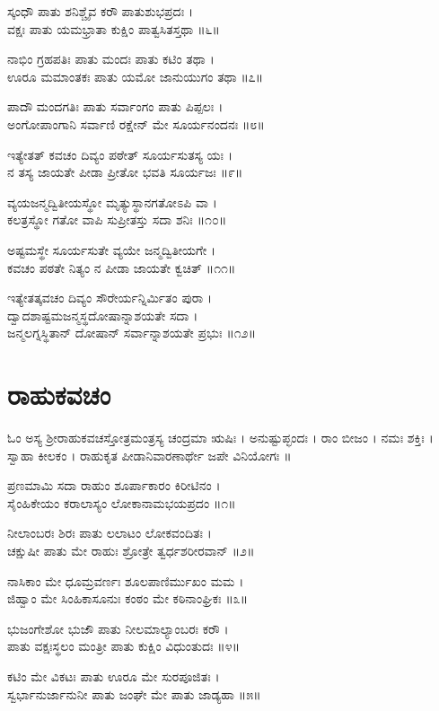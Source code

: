 ಸ್ಕಂಧೌ ಪಾತು ಶನಿಶ್ಚೈವ ಕರೌ ಪಾತುಶುಭಪ್ರದಃ ।\\
ವಕ್ಷಃ ಪಾತು ಯಮಭ್ರಾತಾ ಕುಕ್ಷಿಂ ಪಾತ್ವಸಿತಸ್ತಥಾ ॥೬॥

ನಾಭಿಂ ಗ್ರಹಪತಿಃ ಪಾತು ಮಂದಃ ಪಾತು ಕಟಿಂ ತಥಾ ।\\
ಊರೂ ಮಮಾಂತಕಃ ಪಾತು ಯಮೋ ಜಾನುಯುಗಂ ತಥಾ ॥೭॥

ಪಾದೌ ಮಂದಗತಿಃ ಪಾತು ಸರ್ವಾಂಗಂ ಪಾತು ಪಿಪ್ಪಲಃ ।\\
ಅಂಗೋಪಾಂಗಾನಿ ಸರ್ವಾಣಿ ರಕ್ಷೇನ್ ಮೇ ಸೂರ್ಯನಂದನಃ ॥೮॥

ಇತ್ಯೇತತ್ ಕವಚಂ ದಿವ್ಯಂ ಪಠೇತ್ ಸೂರ್ಯಸುತಸ್ಯ ಯಃ ।\\
ನ ತಸ್ಯ ಜಾಯತೇ ಪೀಡಾ ಪ್ರೀತೋ ಭವತಿ ಸೂರ್ಯಜಃ ॥೯॥

ವ್ಯಯಜನ್ಮದ್ವಿತೀಯಸ್ಥೋ ಮೃತ್ಯುಸ್ಥಾನಗತೋಽಪಿ ವಾ ।\\
ಕಲತ್ರಸ್ಥೋ ಗತೋ ವಾಪಿ ಸುಪ್ರೀತಸ್ತು ಸದಾ ಶನಿಃ ॥೧೦॥

ಅಷ್ಟಮಸ್ಥೇ ಸೂರ್ಯಸುತೇ ವ್ಯಯೇ ಜನ್ಮದ್ವಿತೀಯಗೇ ।\\
ಕವಚಂ ಪಠತೇ ನಿತ್ಯಂ ನ ಪೀಡಾ ಜಾಯತೇ ಕ್ವಚಿತ್ ॥೧೧॥

ಇತ್ಯೇತತ್ಕವಚಂ ದಿವ್ಯಂ ಸೌರೇರ್ಯನ್ನಿರ್ಮಿತಂ ಪುರಾ ।\\
ದ್ವಾದಶಾಷ್ಟಮಜನ್ಮಸ್ಥದೋಷಾನ್ನಾಶಯತೇ ಸದಾ ।\\
ಜನ್ಮಲಗ್ನಸ್ಥಿತಾನ್ ದೋಷಾನ್ ಸರ್ವಾನ್ನಾಶಯತೇ ಪ್ರಭುಃ ॥೧೨॥
\section{ರಾಹುಕವಚಂ}

ಓಂ ಅಸ್ಯ ಶ್ರೀರಾಹುಕವಚಸ್ತೋತ್ರಮಂತ್ರಸ್ಯ ಚಂದ್ರಮಾ ಋಷಿಃ । ಅನುಷ್ಟುಪ್ಛಂದಃ । ರಾಂ ಬೀಜಂ । ನಮಃ ಶಕ್ತಿಃ । ಸ್ವಾಹಾ ಕೀಲಕಂ । ರಾಹುಕೃತ ಪೀಡಾನಿವಾರಣಾರ್ಥೇ ಜಪೇ ವಿನಿಯೋಗಃ ॥

ಪ್ರಣಮಾಮಿ ಸದಾ ರಾಹುಂ ಶೂರ್ಪಾಕಾರಂ ಕಿರೀಟಿನಂ ।\\
ಸೈಂಹಿಕೇಯಂ ಕರಾಲಾಸ್ಯಂ ಲೋಕಾನಾಮಭಯಪ್ರದಂ ॥೧॥

ನೀಲಾಂಬರಃ ಶಿರಃ ಪಾತು ಲಲಾಟಂ ಲೋಕವಂದಿತಃ ।\\
ಚಕ್ಷುಷೀ ಪಾತು ಮೇ ರಾಹುಃ ಶ್ರೋತ್ರೇ ತ್ವರ್ಧಶರೀರವಾನ್ ॥೨॥

ನಾಸಿಕಾಂ ಮೇ ಧೂಮ್ರವರ್ಣಃ ಶೂಲಪಾಣಿರ್ಮುಖಂ ಮಮ ।\\
ಜಿಹ್ವಾಂ ಮೇ ಸಿಂಹಿಕಾಸೂನುಃ ಕಂಠಂ ಮೇ ಕಠಿನಾಂಘ್ರಿಕಃ ॥೩॥

ಭುಜಂಗೇಶೋ ಭುಜೌ ಪಾತು ನೀಲಮಾಲ್ಯಾಂಬರಃ ಕರೌ ।\\
ಪಾತು ವಕ್ಷಃಸ್ಥಲಂ ಮಂತ್ರೀ ಪಾತು ಕುಕ್ಷಿಂ ವಿಧುಂತುದಃ ॥೪॥

ಕಟಿಂ ಮೇ ವಿಕಟಃ ಪಾತು ಊರೂ ಮೇ ಸುರಪೂಜಿತಃ ।\\
ಸ್ವರ್ಭಾನುರ್ಜಾನುನೀ ಪಾತು ಜಂಘೇ ಮೇ ಪಾತು ಜಾಡ್ಯಹಾ ॥೫॥


